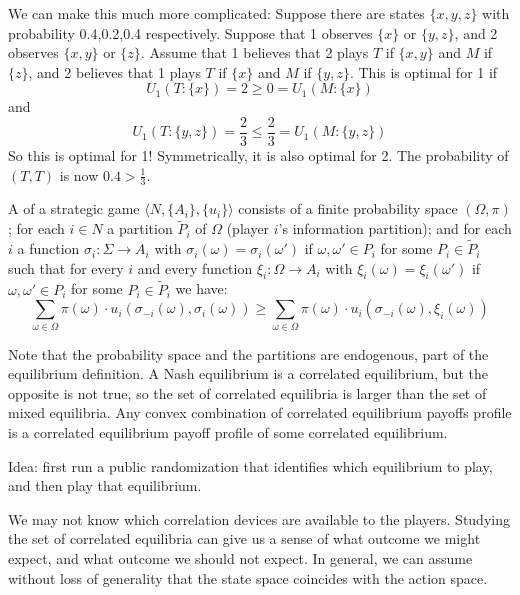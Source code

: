 \documentclass[10pt]{article}
\begin{document}
We can make this much more complicated: Suppose there are states $\{x,y,z\}$ with probability 0.4,0.2,0.4 respectively. Suppose that 1 observes $\{x\}$ or $\{y,z\}$, and 2 observes $\{x,y\}$ or $\{z\}$. Assume that 1 believes that 2 plays $T$ if $\{x,y\}$ and $M$ if $\{z\}$, and 2 believes that 1 plays $T$ if $\{x\}$ and $M$ if $\{y,z\}$. This is optimal for 1 if 
\[
U_1(T : \{x\})= 2  \ge 0 = U_1(M : \{x\})
\]
and
\[
U_1(T : \{y,z\}) = \frac{2}{3} \le \frac{2}{3} = U_1(M : \{y,z\})
\]
So this is optimal for 1! Symmetrically, it is also optimal for 2. The probability of $(T,T)$ is now $0.4 > \frac{1}{3}$.

\begin{definition}
	A  of a strategic game $\langle N,\{A_i\},\{u_i\}\rangle$ consists of a finite probability space $(\Omega,\pi)$; for each $i \in N$ a partition $\tilde{P}_i$ of $\Omega$ (player $i$'s information partition); and for each $i$ a function $\sigma_i: \Sigma \to A_i$ with $\sigma_i(\omega) = \sigma_i(\omega')$ if $\omega,\omega' \in P_i$ for some $P_i \in \tilde{P}_i$ such that for every $i$ and every function $\xi_i: \Omega \to A_i$ with $\xi_i(\omega) = \xi_i(\omega')$ if $\omega,\omega' \in P_i$ for some $P_i \in \tilde{P}_i$ we have: \[\sum_{\omega \in \Omega} \pi(\omega) \cdot u_i(\sigma_{-i}(\omega) , \sigma_i(\omega)) \ge \sum_{\omega \in \Omega} \pi(\omega) \cdot u_i(\sigma_{-i}(\omega) , \xi_i(\omega))\]
\end{definition}

\begin{remark}
Note that the probability space and the partitions are endogenous, part of the equilibrium definition. A Nash equilibrium is a correlated equilibrium, but the opposite is not true, so the set of correlated equilibria is larger than the set of mixed equilibria. Any convex combination of correlated equilibrium payoffs profile is a correlated equilibrium payoff profile of some correlated equilibrium.
\end{remark}

Idea: first run a public randomization that identifies which equilibrium to play, and then play that equilibrium.

We may not know which correlation devices are available to the players. Studying the set of correlated equilibria can give us a sense of what outcome we might expect, and what outcome we should not expect. In general, we can assume without loss of generality that the state space coincides with the action space.
\end{document}
